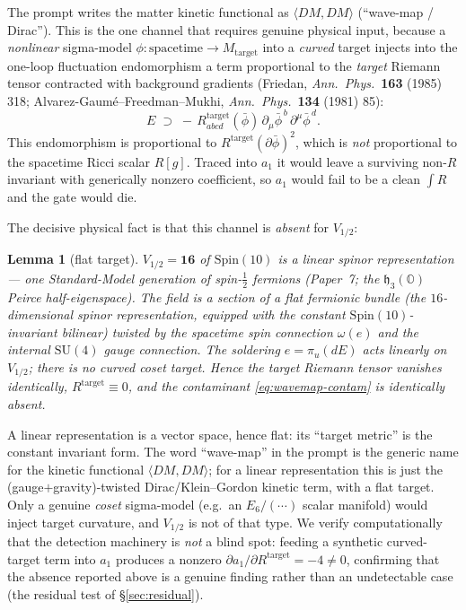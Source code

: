 \documentclass[11pt]{article}
\newtheorem{lemma}{Lemma}
\newcommand{\h}{\mathfrak{h}}
\newcommand{\Oo}{\mathbb{O}}
\newcommand{\Rt}{R^{\mathrm{target}}}
\begin{document}
The prompt writes the matter kinetic functional as $\langle DM,DM\rangle$ (``wave-map /
Dirac''). This is the one channel that requires genuine physical input, because a
\emph{nonlinear} sigma-model $\phi:\text{spacetime}\to M_{\mathrm{target}}$ into a
\emph{curved} target injects into the one-loop fluctuation endomorphism a term proportional
to the \emph{target} Riemann tensor contracted with background gradients (Friedan,
\textit{Ann.\ Phys.}\ \textbf{163} (1985) 318; Alvarez-Gaum\'e--Freedman--Mukhi,
\textit{Ann.\ Phys.}\ \textbf{134} (1981) 85):
\begin{equation}\label{eq:wavemap-contam}
E\;\supset\;-\,\Rt_{abcd}(\bar\phi)\,\partial_\mu\bar\phi^{\,b}\,\partial^\mu\bar\phi^{\,d}.
\end{equation}
This endomorphism is proportional to $\Rt(\partial\bar\phi)^2$, which is \emph{not}
proportional to the spacetime Ricci scalar $R[g]$. Traced into $a_1$ it would leave a
surviving non-$R$ invariant with generically nonzero coefficient, so $a_1$ would fail to be
a clean $\int R$ and the gate would die.

The decisive physical fact is that this channel is \emph{absent} for $V_{1/2}$:
\begin{lemma}[flat target]\label{lem:linear-rep}
$V_{1/2}=\mathbf{16}$ of $\mathrm{Spin}(10)$ is a \emph{linear} spinor representation --- one
Standard-Model generation of spin-$\tfrac12$ fermions (Paper~7; the $\h_3(\Oo)$ Peirce
half-eigenspace). The field is a section of a \emph{flat} fermionic bundle (the $16$-dimensional
spinor representation, equipped with the constant $\mathrm{Spin}(10)$-invariant bilinear)
twisted by the spacetime spin connection $\omega(e)$ and the internal $\mathrm{SU}(4)$ gauge
connection. The soldering $e=\pi_u(dE)$ acts \emph{linearly} on $V_{1/2}$; there is no curved
coset target. Hence the target Riemann tensor vanishes identically, $\Rt\equiv 0$, and the
contaminant \eqref{eq:wavemap-contam} is identically absent.
\end{lemma}
A linear representation is a vector space, hence flat: its ``target metric'' is the constant
invariant form. The word ``wave-map'' in the prompt is the generic name for the kinetic
functional $\langle DM,DM\rangle$; for a linear representation this is just the
(gauge$+$gravity)-twisted Dirac/Klein--Gordon kinetic term, with a flat target. Only a
genuine \emph{coset} sigma-model (e.g.\ an $E_6/(\cdots)$ scalar manifold) would inject target
curvature, and $V_{1/2}$ is not of that type. We verify computationally that the detection
machinery is \emph{not} a blind spot: feeding a synthetic curved-target term into $a_1$ produces
a nonzero $\partial a_1/\partial \Rt=-4\neq0$, confirming that the absence reported above is a
genuine finding rather than an undetectable case (the residual test of \S\ref{sec:residual}).
\end{document}
